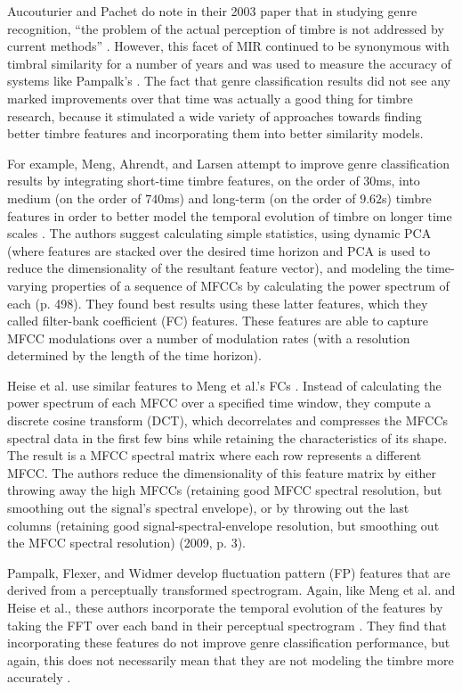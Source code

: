 \documentclass[a4paper,12pt]{report} 	%
\numberwithin{figure}{chapter}
\numberwithin{table}{chapter}
\numberwithin{equation}{chapter}
\begin{document}
\begin{flushleft}
Aucouturier and Pachet do note in their 2003 paper that in studying genre recognition, ``the problem of the actual perception of timbre is not addressed by current methods'' \cite[p. 16]{Aucouturier:2003gs}. However, this facet of MIR continued to be synonymous with timbral similarity for a number of years and was used to measure the accuracy of systems like Pampalk's \cite{Pampalk:2006pr}. The fact that genre classification results did not see any marked improvements over that time was actually a good thing for timbre research, because it stimulated a wide variety of approaches towards finding better timbre features and incorporating them into better similarity models.

For example, Meng, Ahrendt, and Larsen attempt to improve genre classification results by integrating short-time timbre features, on the order of $30$ms, into medium (on the order of $740$ms) and long-term (on the order of $9.62$s) timbre features in order to better model the temporal evolution of timbre on longer time scales \cite[p. 498]{Meng:2005fx}. The authors suggest calculating simple statistics, using dynamic PCA (where features are stacked over the desired time horizon and PCA is used to reduce the dimensionality of the resultant feature vector), and modeling the time-varying properties of a sequence of MFCCs by calculating the power spectrum of each (p. 498). They found best results using these latter features, which they called filter-bank coefficient (FC) features. These features are able to capture MFCC modulations over a number of modulation rates (with a resolution determined by the length of the time horizon). 

Heise et al. use similar features to Meng et al.'s FCs \cite{Heise:2009sp}. Instead of calculating the power spectrum of each MFCC over a specified time window, they compute a discrete cosine transform (DCT), which decorrelates and compresses the MFCCs spectral data in the first few bins while retaining the characteristics of its shape. The result is a MFCC spectral matrix where each row represents a different MFCC. The authors reduce the dimensionality of this feature matrix by either throwing away the high MFCCs (retaining good MFCC spectral resolution, but smoothing out the signal's spectral envelope), or by throwing out the last columns (retaining good signal-spectral-envelope resolution, but smoothing out the MFCC spectral resolution) (2009, p. 3).

Pampalk, Flexer, and Widmer develop fluctuation pattern (FP) features that are derived from a perceptually transformed spectrogram. Again, like Meng et al. and Heise et al., these authors incorporate the temporal evolution of the features by taking the FFT over each band in their perceptual spectrogram \cite[p. 4]{Pampalk:2005ix}. They find that incorporating these features do not improve genre classification performance, but again, this does not necessarily mean that they are not modeling the timbre more accurately \cite[p. 8]{Pampalk:2005ix}.


\end{flushleft}
\end{document}
